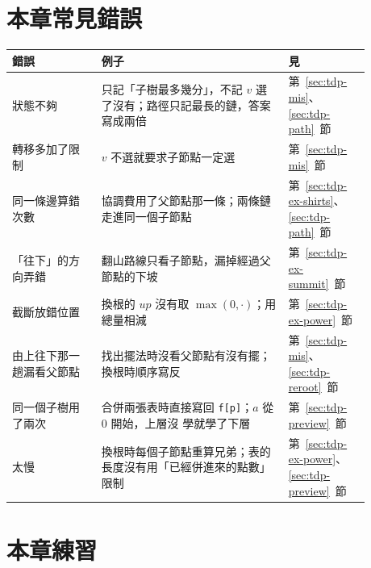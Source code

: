 \section{本章常見錯誤}
\label{sec:tdp-pitfalls}

\begin{center}
\begin{tabular}{p{0.22\linewidth}p{0.46\linewidth}p{0.2\linewidth}}
\toprule
錯誤 & 例子 & 見 \\
\midrule
狀態不夠 & 只記「子樹最多幾分」，不記 $v$ 選了沒有；路徑只記最長的鏈，答案寫成兩倍 &
第~\ref{sec:tdp-mis}、\ref{sec:tdp-path}~節 \\
轉移多加了限制 & $v$ 不選就要求子節點一定選 & 第~\ref{sec:tdp-mis}~節 \\
同一條邊算錯次數 & 協調費用了父節點那一條；兩條鏈走進同一個子節點 &
第~\ref{sec:tdp-ex-shirts}、\ref{sec:tdp-path}~節 \\
「往下」的方向弄錯 & 翻山路線只看子節點，漏掉經過父節點的下坡 &
第~\ref{sec:tdp-ex-summit}~節 \\
截斷放錯位置 & 換根的 $\mathit{up}$ 沒有取 $\max(0, \cdot)$；用總量相減 &
第~\ref{sec:tdp-ex-power}~節 \\
由上往下那一趟漏看父節點 & 找出擺法時沒看父節點有沒有擺；換根時順序寫反 &
第~\ref{sec:tdp-mis}、\ref{sec:tdp-reroot}~節 \\
同一個子樹用了兩次 & 合併兩張表時直接寫回 \texttt{f[p]}；$a$ 從 $0$ 開始，上層沒
學就學了下層 & 第~\ref{sec:tdp-preview}~節 \\
太慢 & 換根時每個子節點重算兄弟；表的長度沒有用「已經併進來的點數」限制 &
第~\ref{sec:tdp-ex-power}、\ref{sec:tdp-preview}~節 \\
\bottomrule
\end{tabular}
\end{center}

\section{本章練習}
\label{sec:ch10-exercises}

